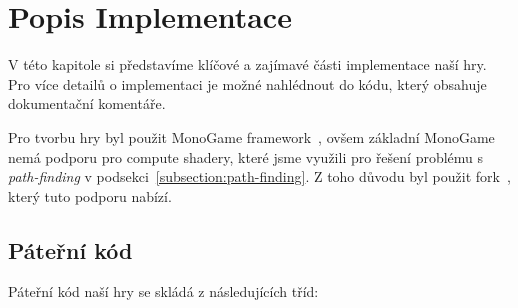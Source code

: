 \chapter{Popis Implementace}
V této kapitole si představíme klíčové a zajímavé části implementace naší hry. Pro více detailů o implementaci je možné nahlédnout do kódu, který obsahuje dokumentační komentáře.

Pro tvorbu hry byl použit MonoGame framework~\cite{MonoGame}, ovšem základní MonoGame nemá podporu pro compute shadery, které jsme využili pro řešení problému s \textit{path-finding} v podsekci~\ref{subsection:path-finding}. Z toho důvodu byl použit fork~\cite{MonoGameCptMax}, který tuto podporu nabízí.

\section{Páteřní kód}
Páteřní kód naší hry se skládá z následujících tříd:


